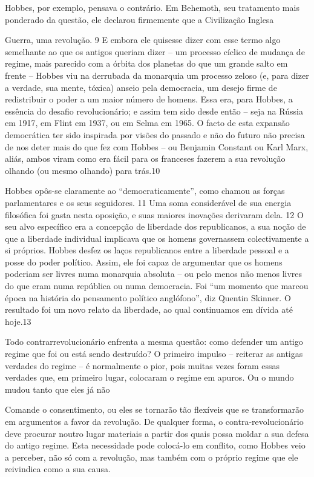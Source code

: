  \par 
Hobbes, por exemplo, pensava o contrário. Em Behemoth, seu tratamento mais ponderado da questão, ele declarou firmemente que a Civilização Inglesa
 \par 
Guerra, uma revolução. {\color{blue}9} E embora ele quisesse dizer com esse termo algo semelhante ao que os antigos queriam dizer – um processo cíclico de mudança de regime, mais parecido com a órbita dos planetas do que um grande salto em frente – Hobbes viu na derrubada da monarquia um processo zeloso (e, para dizer a verdade, sua mente, tóxica) anseio pela democracia, um desejo firme de redistribuir o poder a um maior número de homens. Essa era, para Hobbes, a essência do desafio revolucionário; e assim tem sido desde então – seja na Rússia em 1917, em Flint em 1937, ou em Selma em 1965. O facto de esta expansão democrática ter sido inspirada por visões do passado e não do futuro não precisa de nos deter mais do que fez com Hobbes – ou Benjamin Constant ou Karl Marx, aliás, ambos viram como era fácil para os franceses fazerem a sua revolução olhando (ou mesmo olhando) para trás.{\color{blue}10}
 \par 
Hobbes opôs-se claramente ao “democraticamente”, como chamou as forças parlamentares e os seus seguidores. {\color{blue}11} Uma soma considerável de sua energia filosófica foi gasta nesta oposição, e suas maiores inovações derivaram dela. {\color{blue}12} O seu alvo específico era a concepção de liberdade dos republicanos, a sua noção de que a liberdade individual implicava que os homens governassem colectivamente a si próprios. Hobbes desfez os laços republicanos entre a liberdade pessoal e a posse do poder político. Assim, ele foi capaz de argumentar que os homens poderiam ser livres numa monarquia absoluta – ou pelo menos não menos livres do que eram numa república ou numa democracia. Foi “um momento que marcou época na história do pensamento político anglófono”, diz Quentin Skinner. O resultado foi um novo relato da liberdade, ao qual continuamos em dívida até hoje.{\color{blue}13}
 \par 
Todo contrarrevolucionário enfrenta a mesma questão: como defender um antigo regime que foi ou está sendo destruído? O primeiro impulso – reiterar as antigas verdades do regime – é normalmente o pior, pois muitas vezes foram essas verdades que, em primeiro lugar, colocaram o regime em apuros. Ou o mundo mudou tanto que eles já não
 \par 
Comande o consentimento, ou eles se tornarão tão flexíveis que se transformarão em argumentos a favor da revolução. De qualquer forma, o contra-revolucionário deve procurar noutro lugar materiais a partir dos quais possa moldar a sua defesa do antigo regime. Esta necessidade pode colocá-lo em conflito, como Hobbes veio a perceber, não só com a revolução, mas também com o próprio regime que ele reivindica como a sua causa.
